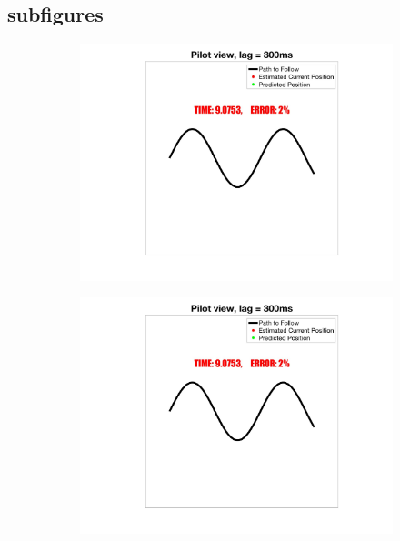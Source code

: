 \documentclass{article}
\begin{document}
\subsection{subfigures}
		\begin{figure}[H]
			\begin{subfigure}[b]{0.5\textwidth}
				\centering
				\includegraphics[width=\textwidth]{Figures/Example}
			\end{subfigure}
			\hfill
			\begin{subfigure}[b]{0.5\textwidth}
				\centering
				\includegraphics[width=\textwidth]{Figures/Example}
			\end{subfigure}
			\vfill
			\begin{subfigure}[b]{0.5\textwidth}

\end{subfigure}
\end{figure}
\end{document}
